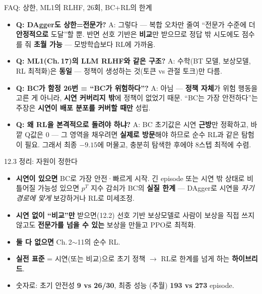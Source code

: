 \documentclass[aspectratio=169,11pt]{beamer}
\begin{document}
\begin{frame}{FAQ: 상한, ML1의 RLHF, 26회, BC+RL의 한계}
  \small
  \begin{itemize}
    \item \textbf{Q: DAgger도 상한=전문가?} A: 그렇다 — 복합 오차만
      줄여 ``전문가 수준에 더 \textbf{안정적으로} 도달''할 뿐.
      반면 선호 기반은 \textbf{비교}만 받으므로 정답 밖 시도에도
      점수를 줘 \textbf{초월 가능} — 모방학습보다 RL에 가까움.
    \item \textbf{Q: ML1(Ch.\,17)의 LLM RLHF와 같은 구조?} A:
      수학(BT 모델, 보상모델, RL 최적화)은 \textbf{동일} —
      정책이 생성하는 것(토큰 vs 관절 토크)만 다름.
    \item \textbf{Q: BC가 함정 26번 = ``BC가 위험하다''?} A: 아님 —
      \textbf{정책 자체}가 위험 행동을 고른 게 아니라, \textbf{시연
      커버리지 밖}에 정책이 없었기 때문. ``BC는 가장 안전하다''는
      주장은 \textbf{시연이 배포 분포를 커버할 때만} 성립.
    \item \textbf{Q: 왜 RL을 \textbf{본격적으로} 돌려야 하냐?} A:
      BC 초기값은 시연 \textbf{근방}만 정확하고, 바깥 Q값은 0 —
      그 영역을 채우려면 \textbf{실제로 방문}해야 하므로 순수 RL과
      같은 탐험이 필요. 그래서 최종 $-9.15$에 머물고, 충분히 탐색한
      후에야 8스텝 최적에 수렴.
  \end{itemize}
\end{frame}

\begin{frame}{12.3 정리: 자원이 정한다}
  \begin{itemize}
    \item \textbf{시연이 있으면} BC로 가장 안전·빠르게 시작. 긴
      episode 또는 시연 밖 상태로 비틀어질 가능성 있으면 $p^T$
      지수 감쇠가 BC의 \textbf{실질 한계} — DAgger로 시연을
      \textit{자기 경로에 맞게} 보강하거나 RL로 미세조정.
    \item \textbf{시연 없이 ``비교''만} 받으면(12.2) 선호 기반
      보상모델로 사람이 보상을 직접 쓰지 않고도 \textbf{전문가를
      넘을 수 있는} 보상을 만들고 PPO로 최적화.
    \item \textbf{둘 다 없으면} Ch.\,2$\sim$11의 순수 RL.
    \item \textbf{실전 표준} = 시연(또는 비교)으로 초기 정책
      $\to$ RL로 한계를 넘게 하는 \textbf{하이브리드}.
    \item 숫자로: 초기 안전성 \textbf{9 vs 26/30}, 최종 성능
      (추월) \textbf{193 vs 273} episode.
  \end{itemize}
\end{frame}
\end{document}
